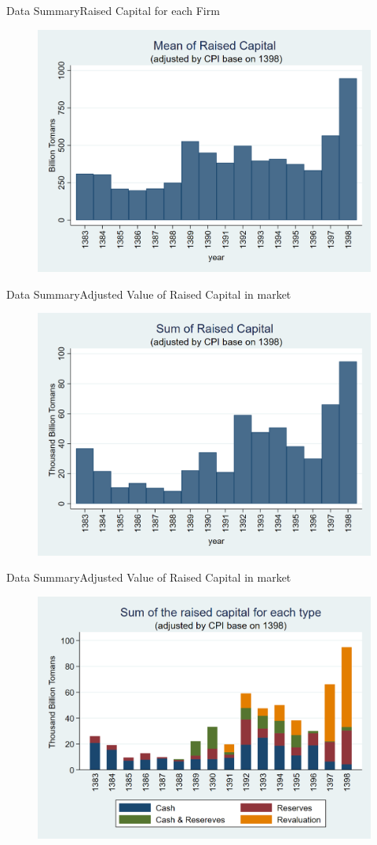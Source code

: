 \documentclass{beamer}
\begin{document}
\begin{frame}{Data Summary}{Raised Capital for each Firm}
\begin{figure}
\centering
\includegraphics[width=0.7\linewidth]{Output/MeanCapRaiseAdjusted.png}
\label{fig:meancapraise}
\end{figure}
\end{frame}

\begin{frame}{Data Summary}{Adjusted Value of Raised Capital in market}
\begin{figure}
\centering
\includegraphics[width=0.7\linewidth]{Output/SumCapRaiseAdjusted.png}
\label{fig:SumCapRaise}
\end{figure}
\end{frame}

\begin{frame}{Data Summary}{Adjusted Value of Raised Capital in market}
\begin{figure}
	\centering
	\includegraphics[width=0.7\linewidth]{Output/SumCapRaiseAdjustedEachtype}
	\label{fig:SumCapRaise2}
\end{figure}

\end{frame}
\end{document}
